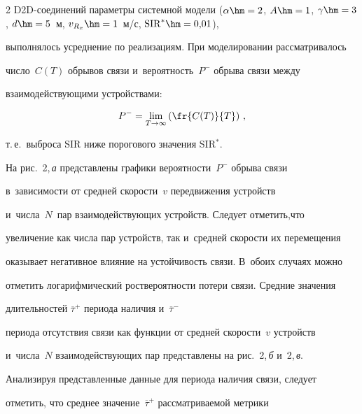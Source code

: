 \begin{multicols}{2}
D2D-со\-еди\-не\-ний параметры системной модели ($\alpha\hm = 2$, $A\hm = 


1$, $\gamma\hm = 3$, $d\hm = 5$~м, $v_{R_x}\hm= 1$~м/с, $\mathrm{SIR}^*\hm= 0{,}01$), 


выполнялось усреднение по реализациям. При моделировании рассматривалось 


число~$C(T)$ обрывов связи и~вероятность~$P^{-}$ обрыва связи между 


взаимодействующими устройствами:


$$


P^- = \lim\limits_{T\to \infty} 


\left(\fr{C(T)}{T}\right)\,,


$$


 т.\,е.\ выброса SIR ниже порогового значения SIR$^*$. 





На рис.~2,\,\textit{а} представлены графики ве\-ро\-ят\-ности~$P^-$ обрыва связи 


в~зависимости от средней скорости~$v$ передвижения устройств 


и~числа~$N$~пар взаимодействующих устройств. Следует отметить,\linebreak что 


увеличение как числа пар устройств, так и~средней скорости их перемещения 


оказывает не\-гативное влияние на устойчивость связи. В~обоих слу\-чаях можно 


отметить логарифмический рост\linebreak ве\-ро\-ят\-ности потери связи. Средние значения 


длительностей $\overline{\tau}^+$ периода наличия и~$\overline{\tau}^-$ 


периода отсутствия связи как функции от средней скорости~$v$ устройств 


и~числа~$N$ взаимодействующих пар представлены на рис.~2,\,\textit{б} и~2,\,\textit{в}. 








  


  


  Анализируя представленные данные для периода наличия связи, следует 


отметить, что среднее значение~$\overline{\tau}^+$ рассматриваемой метрики 



\end{multicols}
